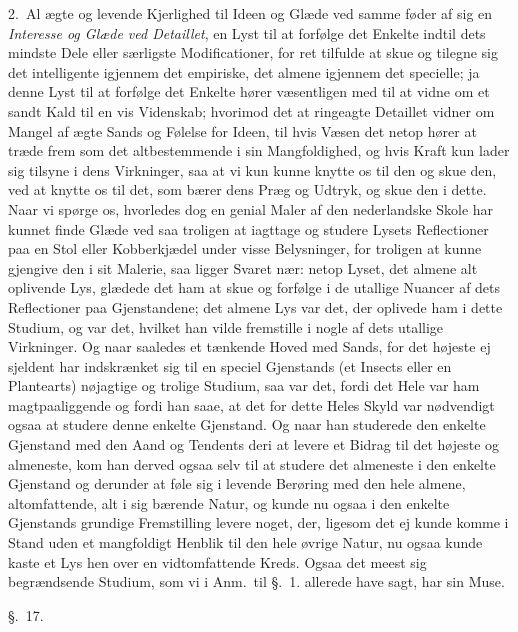 \documentclass[12pt,a4paper]{book}
\newcommand{\apage}[1]{\marginnote{\footnotesize\textit{[#1]}}}
\begin{document}
2.~Al ægte og levende Kjerlighed til Ideen og Glæde ved samme føder af sig en
\emph{Interesse og Glæde ved Detaillet}, en Lyst til at forfølge det Enkelte
indtil dets mindste Dele eller særligste Modificationer, for ret tilfulde at skue
og tilegne sig det intelligente igjennem det empiriske, det almene igjennem det
specielle; ja denne Lyst til at forfølge det Enkelte hører væsentligen med til at
vidne om et sandt Kald til en vis Videnskab; hvorimod det at ringeagte Detaillet
vidner om Mangel af ægte Sands og Følelse for Ideen, til hvis Væsen det netop
hører at træde frem som det altbestemmende i sin Mangfoldighed, og hvis Kraft kun
lader sig tilsyne i dens Virkninger, saa at vi kun kunne knytte os til den og skue
den, ved at knytte os til det, som bærer dens Præg og Udtryk, og skue den i dette.
Naar vi spørge os, hvorledes dog en genial Maler af \apage{152} den nederlandske Skole har
kunnet finde Glæde ved saa troligen at iagttage og studere Lysets Reflectioner paa
en Stol eller Kobberkjædel under visse Belysninger, for troligen at kunne gjengive
den i sit Malerie, saa ligger Svaret nær: netop Lyset, det almene alt oplivende
Lys, glædede det ham at skue og forfølge i de utallige Nuancer af dets
Reflectioner paa Gjenstandene; det almene Lys var det, der oplivede ham i dette
Studium, og var det, hvilket han vilde fremstille i nogle af dets utallige
Virkninger. Og naar saaledes et tænkende Hoved med Sands, for det højeste ej
sjeldent har indskrænket sig til en speciel Gjenstands (et Insects eller en
Plantearts) nøjagtige og trolige Studium, saa var det, fordi det Hele var ham
magtpaaliggende og fordi han saae, at det for dette Heles Skyld var nødvendigt
ogsaa at studere denne enkelte Gjenstand. Og naar han studerede den enkelte
Gjenstand med den Aand og Tendents deri at levere et Bidrag til det højeste og
almeneste, kom han derved ogsaa selv til at studere det almeneste i den enkelte
Gjenstand og derunder at føle sig i levende Berøring med den hele almene,
altomfattende, alt i sig bærende Natur, og kunde nu ogsaa i den enkelte Gjenstands
grundige Fremstilling levere noget, der, ligesom det ej kunde komme i Stand uden
et mangfoldigt Henblik til den hele øvrige Natur, nu ogsaa kunde kaste et Lys hen
over en \apage{153} vidtomfattende Kreds. Ogsaa det meest sig begrændsende Studium, som vi i
Anm.\ til §.~1. allerede have sagt, har sin Muse.

\begin{center}\large\S.~17.\end{center}
\end{document}
